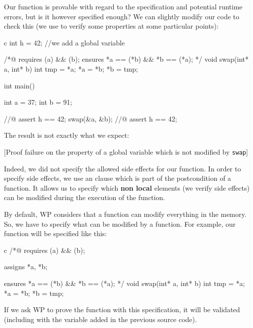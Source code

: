 \documentclass[middle]{zmdocument}
\begin{document}


Our  function is provable with regard to the specification
and potential runtime errors, but is it however specified enough? We can
slightly modify our code to check this (we use  to verify
some properties at some particular points):



\begin{CodeBlock}{c}
int h = 42; //we add a global variable

/*@
  requires \valid(a) && \valid(b);
  ensures  *a == \old(*b) && *b == \old(*a);
*/
void swap(int* a, int* b){
  int tmp = *a;
  *a = *b;
  *b = tmp;
}

int main(){
  int a = 37;
  int b = 91;

  //@ assert h == 42;
  swap(&a, &b);
  //@ assert h == 42;
}
\end{CodeBlock}



The result is not exactly what we expect:



[Proof failure on the property of a global variable which is not
  modified by \texttt{swap}]


Indeed, we did not specify the allowed side effects for our function. In
order to specify side effects, we use an  clause which is
part of the postcondition of a function. It allows us to specify which
\textbf{non local} elements (we verify side effects) can be modified
during the execution of the function.



By default, WP considers that a function can modify everything in the
memory. So, we have to specify what can be modified by a function. For
example, our  function will be specified like this:



\begin{CodeBlock}{c}
/*@
  requires \valid(a) && \valid(b);
 
  assigns *a, *b;

  ensures  *a == \old(*b) && *b == \old(*a);
*/
void swap(int* a, int* b){
  int tmp = *a;
  *a = *b;
  *b = tmp;
}
\end{CodeBlock}



If we ask WP to prove the function with this specification, it will be
validated (including with the variable added in the previous source
code).
\end{document}
